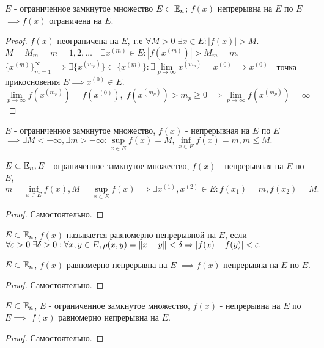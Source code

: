 \documentclass[../main.tex]{subfiles}
\begin{document}
\begin{theorem}
    $E$ - ограниченное замкнутое множество $E\subset \E_{n}$; $f(x)$ непрерывна на $E$ по $E$ $\implies f(x)$ ограничена на $E$.
\end{theorem}
\begin{proof}
    $f(x)$ неограничена на $E$, т.е $\forall M>0 \; \exists x \in E : |f(x)|>M$.\\ $M=M_{m}=m=1,2,\dots \quad \exists x^{(m)}\in E: |f(x^{(m)})|> M_{m}=m.$
    \\$\{x^{(m)}\}_{m=1}^{\infty} \implies \exists \{ x^{(m_{p})}\}\subset \{x^{(m)}\}: \exists \lim\limits_{p  \to \infty} x^{(m_{p})}=x^{(0)} \implies x^{(0)}$ - точка прикосновения $E\implies x^{(0)}\in E$.\\ 
    $\lim\limits_{p \to \infty}f(x^{(m_{p})})=f(x^{(0)}),|f(x^{(m_{p})})>m_{p}\geqslant 0 \implies \lim\limits_{p   \to \infty}f(x^{(m_{p})}) =\infty $
\end{proof}
$E$ - ограниченное замкнутое множество, $f(x)$ - непрерывная на $E$ по $E$ $\implies \exists M < +\infty, \exists m> -\infty: \underset{x \in E}{\sup}{f(x)}=M, \underset{x\in E}{\inf}{f(x)}=m, m\leqslant M. $ 
\begin{theorem}
    $E\subset \E_{n}, E$ - ограниченное замкнутое множество, $f(x)$ - непрерывная на $E$ по $E$, $m = \underset{x\in E}{\inf}f(x), M = \underset{x\in E}{\sup}f(x) \implies \exists x^{(1)},x^{(2)} \in E : f(x_{1})=m, f(x_{2})=M.$
\end{theorem}
\begin{proof}
    Самостоятельно. 
\end{proof}
\begin{definition} 
    $E \subset \E_{n}$, $f(x)$ называется равномерно непрерывной на $E$, если $\forall \varepsilon > 0 \; \exists \delta > 0 :\\ \forall x,y \in E, \rho(x,y) = \| x-y\| < \delta \implies |f(x)-f(y)|<\varepsilon.$
\end{definition}
\begin{theorem}
    $E\subset \E_{n}$, $f(x)$ равномерно непрерывна на $E$ $\implies f(x)$ непрерывна на $E$ по $E$.
\end{theorem}
\begin{proof}
    Самостоятельно.
\end{proof}
\begin{theorem}
    $E\subset \E_{n}$, $E$ - ограниченное замкнутое множество, $f(x)$ - непрерывна на $E$ по $E\implies$ $f(x)$ равномерно непрерывна на $E$.
\end{theorem}
\begin{proof}
    Самостоятельно.
\end{proof}
\end{document}
